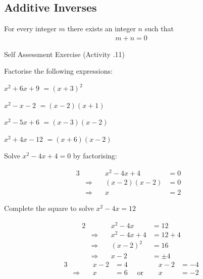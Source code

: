 \documentclass[\main/notes.tex]{subfiles}
\begin{document}
			\subsection{Additive Inverses}
				For every integer $m$ there exists an integer $n$ such that
				\nopagebreak
				\begin{align*}
					m + n = 0
				\end{align*}
			\pagebreak
			\begin{exercise}{Self Assessment Exercise (Activity \thechapter.11)}
				\begin{questions}
					\item Factorise the following expressions:
						\begin{questions}
							\item $ x^{2} + 6x + 9$ {\answer $= (x + 3)^{2}$}
							\item $ x^{2} - x - 2$ {\answer $= (x - 2)(x + 1) $}
							\item $ x^{2} - 5x + 6$ {\answer $= (x - 3)(x - 2) $}
							\item $ x^{2} + 4x - 12$ {\answer $= (x + 6)(x - 2) $}
						\end{questions}
					\item Solve $x^{2} - 4x + 4 = 0$ by factorising:
						\begin{answer}
							\begin{alignat*}{3}
								& \qquad & x^{2} - 4x + 4 &= 0\\
								& \Rightarrow \quad & (x - 2)(x - 2) &= 0\\
								& \Rightarrow \quad &x &= 2 &
							\end{alignat*}
						\end{answer}
					\item Complete the square to solve $x^{2} - 4x = 12$
						\begin{answer}
							\begin{alignat*}{2}
								& \qquad &x^{2} - 4x &= 12\\
								& \Rightarrow \quad &x^{2} - 4x + 4 &= 12 + 4\\
								& \Rightarrow \quad &(x - 2)^{2} &= 16\\
								& \Rightarrow \quad & x - 2 &= \pm 4
							\end{alignat*}
							\begin{alignat*}{3}
								& \qquad &x - 2 &= 4 \qquad &x - 2 &= -4\\
								& \Rightarrow \quad &x &= 6 \quad \text{ or } \quad &x &= -2
							\end{alignat*}

\end{answer}
\end{questions}
\end{exercise}
\end{document}
